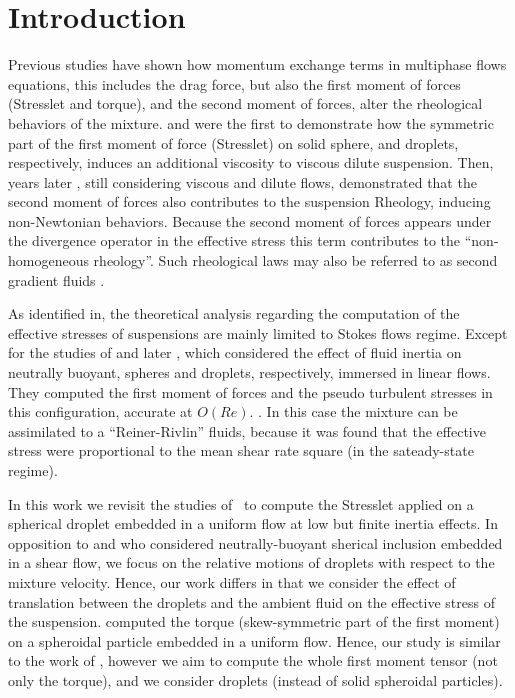 \section{Introduction}

Previous studies have shown how momentum exchange terms in multiphase flows equations, this includes the drag force, but also the first moment of forces (Stresslet and torque), and the second moment of forces, alter the rheological behaviors of the mixture.
\citet{einstein1905neue} and \citet{taylor1932viscosity} were the first to demonstrate how the symmetric part of the first moment of force (Stresslet) on solid sphere, and droplets, respectively, induces an additional viscosity to viscous dilute suspension. 
Then, years later \citet{lhuillier1996contribution,jackson1997locally,zhang1997momentum}, still considering viscous and dilute flows, demonstrated that the second moment of forces also contributes to the suspension Rheology, inducing non-Newtonian behaviors.
Because the second moment of forces appears under the divergence operator in the effective stress this term contributes to the ``non-homogeneous rheology''. 
Such rheological laws may also be referred to as second gradient fluids \citet{renee2023thermomecanique}.  

As identified in, \citet{fintzi2025averaged} the theoretical analysis regarding the computation of the effective stresses of suspensions are mainly limited to Stokes flows regime. 
Except for the studies of \citet{stone2001inertial} and later \citet{raja2010inertial}, which considered the effect of fluid inertia on neutrally buoyant, spheres and droplets, respectively, immersed in linear flows.
They computed the first moment of forces and the pseudo turbulent stresses in this configuration, accurate at $O(Re)$.  . 
In this case the mixture can be assimilated to a ``Reiner-Rivlin'' fluids, because it was found that the effective stress were proportional to the mean shear rate square (in the sateady-state regime). 

In this work we revisit the studies of~\citet{stone2001inertial,raja2010inertial}  to compute the Stresslet applied on a spherical droplet embedded in a uniform flow at low but finite inertia effects. 
In opposition to \citet{stone2001inertial} and \citet{raja2010inertial} who considered neutrally-buoyant sherical inclusion embedded in a shear flow, we focus on the relative motions of droplets with respect to the mixture velocity. 
Hence, our work differs in that we consider the effect of translation between the droplets and the ambient fluid on the effective stress of the suspension.
\citet{dabade2015} computed the torque (skew-symmetric part of the first moment) on a spheroidal particle embedded in a uniform flow. 
Hence, our study is similar to the work of \citet{dabade2015}, however we aim to compute the whole first moment tensor (not only the torque), and we consider droplets (instead of solid spheroidal particles). 

